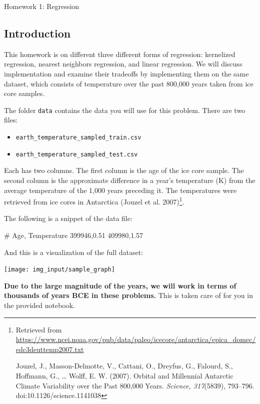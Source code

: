 \documentclass[submit]{../harvardml}
\begin{document}
\begin{center}
  {\Large Homework 1: Regression}\\
\end{center}

\subsection*{Introduction}
This homework is on different three different forms of regression:
kernelized regression, nearest neighbors regression, and linear
regression.  We will discuss implementation and examine their
tradeoffs by implementing them on the same dataset, which consists of
temperature over the past 800,000 years taken from ice core samples.

The folder \verb|data| contains the data you will use for this
problem. There are two files:
\begin{itemize}
  \item \verb|earth_temperature_sampled_train.csv|
  \item \verb|earth_temperature_sampled_test.csv|
\end{itemize}

Each has two columns.  The first column is the age of the ice core
sample.  The second column is the approximate difference in a year's temperature (K)
from the average temperature of the 1,000 years preceding it. The temperatures were retrieved from ice cores in
Antarctica (Jouzel et al. 2007)\footnote{Retrieved from
  \url{https://www.ncei.noaa.gov/pub/data/paleo/icecore/antarctica/epica_domec/edc3deuttemp2007.txt}

  Jouzel, J., Masson-Delmotte, V., Cattani, O., Dreyfus, G., Falourd,
  S., Hoffmann, G., … Wolff, E. W. (2007). Orbital and Millennial
  Antarctic Climate Variability over the Past 800,000 Years.
  \emph{Science, 317}(5839), 793–796. doi:10.1126/science.1141038}.

The following is a snippet of the data file:

\begin{csv}
  # Age, Temperature
  399946,0.51
  409980,1.57
\end{csv}

\noindent And this is a visualization of the full dataset:
\begin{center}
  \texttt{[image: img\_input/sample\_graph]}
\end{center}
\noindent


\textbf{Due to the large magnitude of the years, we will work in terms
  of thousands of years BCE in these problems.} This is taken care of
for you in the provided notebook.
\end{document}
